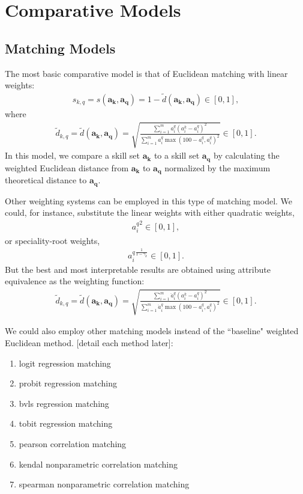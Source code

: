 \documentclass{elsarticle} %
\begin{document}

\section{Comparative Models}
\subsection{Matching Models}
The most basic comparative model is that of Euclidean matching with linear
weights:
\begin{gather}
    s_{k,q} =
    s(\boldsymbol{a_k}, \boldsymbol{a_q}) =
    1 - \tilde{d}(\boldsymbol{a_k}, \boldsymbol{a_q})
    \in [0,1]
    ,
\end{gather}
where
\begin{gather}
    \tilde{d}_{k,q} =
    \tilde{d}(\boldsymbol{a_k}, \boldsymbol{a_q}) =
    \sqrt{
    \frac{
    \sum_{i = 1}^{m}{
    a_{i}^{q} (a_{i}^{k} - a_{i}^{q})^2
    }
    }{
    \sum_{i = 1}^{m}{
    a_{i}^{q} \max(100 - a_{i}^{q}, a_{i}^{q})^2
    }
    }
    }
    \in [0,1]
    .
\end{gather}
In this model, we compare a skill set $\boldsymbol{a_k}$ to a skill set $\boldsymbol{a_q}$ by calculating the weighted Euclidean distance from $\boldsymbol{a_k}$ to $\boldsymbol{a_q}$ normalized by the maximum theoretical distance to $\boldsymbol{a_q}$.

Other weighting systems can be employed in this type of matching model. We could, for instance, substitute the linear weights with either quadratic weights,
\begin{gather}
    {a_{i}^{q}} ^ 2
    \in [0,1]
    ,
\end{gather}
or speciality-root weights,
\begin{gather}
    {a_{i}^{q}} ^ {
        \frac{1}{1 - \gamma_k}
    }
    \in [0,1]
    .
\end{gather}
But the best and most interpretable results are obtained using attribute equivalence as the weighting function:
\begin{gather}
    \tilde{d}_{k,q} =
    \tilde{d}(\boldsymbol{a_k}, \boldsymbol{a_q}) =
    \sqrt{
    \frac{
    \sum_{i = 1}^{m}{
    \ddot{a}_{i}^{q} (a_{i}^{k} - a_{i}^{q})^2
    }
    }{
    \sum_{i = 1}^{m}{
    \ddot{a}_{i}^{q} \max(100 - a_{i}^{q}, a_{i}^{q})^2
    }
    }
    }
    \in [0,1]
    .
\end{gather}

We could also employ other matching models instead of the ``baseline" weighted Euclidean method. [detail each method later]:
\begin{enumerate}
    \item logit regression matching
    \item probit regression matching
    \item bvls regression matching
    \item tobit regression matching
    \item pearson correlation matching
    \item kendal nonparametric correlation matching
    \item spearman nonparametric correlation matching
\end{enumerate}
\end{document}
